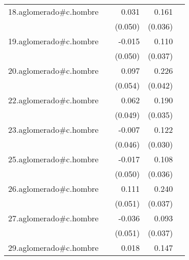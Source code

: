 {\begin{longtable}{l*{4}{D{.}{.}{-1}}}
\addlinespace
18.aglomerado#c.hombre&                     &       0.031         &       0.161\sym{***}&                     \\
            &                     &     (0.050)         &     (0.036)         &                     \\
\addlinespace
19.aglomerado#c.hombre&                     &      -0.015         &       0.110\sym{**} &                     \\
            &                     &     (0.050)         &     (0.037)         &                     \\
\addlinespace
20.aglomerado#c.hombre&                     &       0.097         &       0.226\sym{***}&                     \\
            &                     &     (0.054)         &     (0.042)         &                     \\
\addlinespace
22.aglomerado#c.hombre&                     &       0.062         &       0.190\sym{***}&                     \\
            &                     &     (0.049)         &     (0.035)         &                     \\
\addlinespace
23.aglomerado#c.hombre&                     &      -0.007         &       0.122\sym{***}&                     \\
            &                     &     (0.046)         &     (0.030)         &                     \\
\addlinespace
25.aglomerado#c.hombre&                     &      -0.017         &       0.108\sym{**} &                     \\
            &                     &     (0.050)         &     (0.036)         &                     \\
\addlinespace
26.aglomerado#c.hombre&                     &       0.111\sym{*}  &       0.240\sym{***}&                     \\
            &                     &     (0.051)         &     (0.037)         &                     \\
\addlinespace
27.aglomerado#c.hombre&                     &      -0.036         &       0.093\sym{*}  &                     \\
            &                     &     (0.051)         &     (0.037)         &                     \\
\addlinespace
29.aglomerado#c.hombre&                     &       0.018         &       0.147\sym{***}&                     \\

\end{longtable}}
